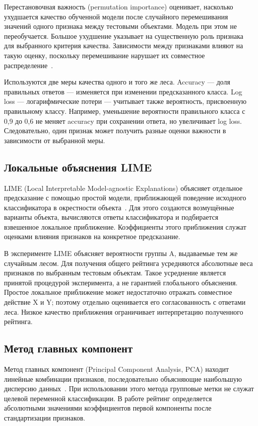 \documentclass{article}
\begin{document}
Перестановочная важность (permutation importance) оценивает, насколько ухудшается качество обученной модели после случайного перемешивания значений одного признака между тестовыми объектами. Модель при этом не переобучается. Большое ухудшение указывает на существенную роль признака для выбранного критерия качества. Зависимости между признаками влияют на такую оценку, поскольку перемешивание нарушает их совместное распределение~\cite{strobl2008}.

Используются две меры качества одного и того же леса. Accuracy --- доля правильных ответов --- изменяется при изменении предсказанного класса. Log loss --- логарифмические потери --- учитывает также вероятность, присвоенную правильному классу. Например, уменьшение вероятности правильного класса с 0,9 до 0,6 не меняет accuracy при сохранении ответа, но увеличивает log loss. Следовательно, один признак может получить разные оценки важности в зависимости от выбранной меры.

\subsection{Локальные объяснения LIME}

LIME (Local Interpretable Model-agnostic Explanations) объясняет отдельное предсказание с помощью простой модели, приближающей поведение исходного классификатора в окрестности объекта~\cite{ribeiro2016}. Для этого создаются возмущённые варианты объекта, вычисляются ответы классификатора и подбирается взвешенное локальное приближение. Коэффициенты этого приближения служат оценками влияния признаков на конкретное предсказание.

В эксперименте LIME объясняет вероятности группы A, выдаваемые тем же случайным лесом. Для получения общего рейтинга усредняются абсолютные веса признаков по выбранным тестовым объектам. Такое усреднение является принятой процедурой эксперимента, а не гарантией глобального объяснения. Простое локальное приближение может недостаточно отражать совместное действие X и Y; поэтому отдельно оценивается его согласованность с ответами леса. Низкое качество приближения ограничивает интерпретацию полученного рейтинга.

\subsection{Метод главных компонент}

Метод главных компонент (Principal Component Analysis, PCA) находит линейные комбинации признаков, последовательно объясняющие наибольшую дисперсию данных~\cite{sklearnpca}. При использовании этого метода групповые метки не служат целевой переменной классификации. В работе рейтинг определяется абсолютными значениями коэффициентов первой компоненты после стандартизации признаков.
\end{document}
